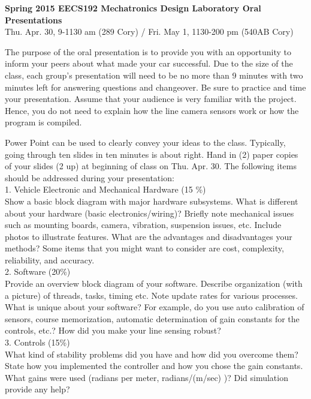 \documentclass[11pt]{article}
\begin{document}
\thispagestyle{empty}

{\bf Spring 2015 EECS192 Mechatronics Design Laboratory Oral Presentations }\\

Thu. Apr. 30, 9-1130 am (289 Cory) / Fri. May 1, 1130-200 pm (540AB Cory)

The purpose of the oral presentation is to provide you with an
opportunity to inform your peers about what made your car successful.
Due to the size of the class, each group's presentation will
need to be no more than 9 minutes with two minutes left for
answering questions and changeover. 
Be sure to practice and time your presentation.
Assume that your audience is very familiar with the project.  Hence, you do
not need to explain how the line camera sensors work or how the program
is compiled.

Power Point can be used to clearly convey your ideas to the class.
Typically, going through ten slides in ten minutes is about right.
Hand in (2) paper copies of your slides (2 up) at beginning of class on
Thu. Apr. 30. The following items should be addressed during your
presentation:\\

1.  Vehicle Electronic and Mechanical Hardware (15 \%)\\
Show a basic block diagram with major hardware subsystems.
What is different about your hardware (basic electronics/wiring)? 
Briefly note mechanical
issues such as mounting boards, camera, vibration, suspension issues, etc.
Include photos to illustrate features.
What are the
advantages and disadvantages your methods? 
Some items that you might want to consider are cost, complexity,
reliability, and accuracy.\\ 

2.  Software (20\%)\\
Provide an overview block diagram of your software.
Describe organization (with a picture) of threads, tasks, timing etc.
Note update rates for various processes.
What is unique about your software?  For example, do
you use auto calibration of sensors, course memorization, automatic
determination of gain constants for the controls, etc.?
How did you make your line sensing robust?\\

3.  Controls (15\%)\\
What kind of stability problems did you have and how
did you overcome them?  State how you
implemented the controller and how you chose the gain constants.
What gains were used (radians per meter, radians/(m/sec) )? 
Did simulation provide any help?\\
\end{document}
